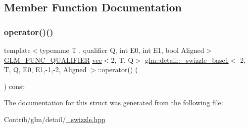 \subsection{Member Function Documentation}
\mbox{\label{structglm_1_1detail_1_1__swizzle__base1_3_012_00_01_t_00_01_q_00_01_e0_00_01_e1_00-1_00-2_00_01_aligned_01_4_ae4bac86c7894c7c68590818deb920945}} 
\subsubsection{\texorpdfstring{operator()()}{operator()()}}
{\footnotesize\ttfamily template$<$typename T , qualifier Q, int E0, int E1, bool Aligned$>$ \\
\mbox{\hyperlink{setup_8hpp_a33fdea6f91c5f834105f7415e2a64407}{G\+L\+M\+\_\+\+F\+U\+N\+C\+\_\+\+Q\+U\+A\+L\+I\+F\+I\+ER}} \mbox{\hyperlink{structglm_1_1vec}{vec}}$<$2, T, Q$>$ \mbox{\hyperlink{structglm_1_1detail_1_1__swizzle__base1}{glm\+::detail\+::\+\_\+swizzle\+\_\+base1}}$<$ 2, T, Q, E0, E1,-\/1,-\/2, Aligned $>$\+::operator() (\begin{DoxyParamCaption}{ }\end{DoxyParamCaption}) const\hspace{0.3cm}{\ttfamily [inline]}}



The documentation for this struct was generated from the following file\+:\begin{DoxyCompactItemize}
\item 
Contrib/glm/detail/\mbox{\hyperlink{__swizzle_8hpp}{\+\_\+swizzle.\+hpp}}\end{DoxyCompactItemize}
